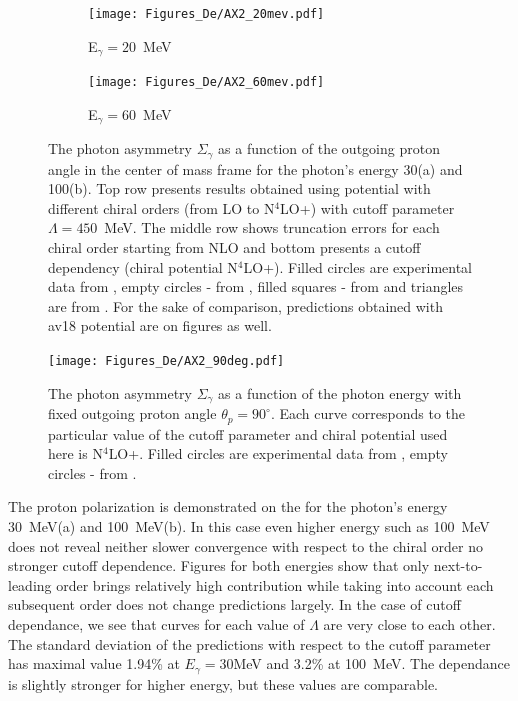     \begin{figure}[h]
        \centering
        \begin{subfigure}[b]{0.46\textwidth}
            \texttt{[image: Figures\_De/AX2\_20mev.pdf]}
            \caption{\small E$_\gamma = 20$~MeV}
            \label{AX_20_vert}
        \end{subfigure}
        \begin{subfigure}[b]{0.46\textwidth}
            \texttt{[image: Figures\_De/AX2\_60mev.pdf]}
            \caption{\small E$_\gamma = 60$~MeV}
            \label{AX_60_vert}
        \end{subfigure}
        \caption{The photon asymmetry $\Sigma_\gamma$ 
        as a function of the outgoing proton angle in the center of mass frame 
        for the photon's energy \SI{30}{\mev}(a) and \SI{100}{\mev}(b).
        Top row presents results obtained using potential
        with different chiral orders (from LO to N$^4$LO+) with cutoff parameter $\Lambda=450$~MeV.
        The middle row shows truncation errors for each 
        chiral order starting from NLO and
        bottom presents a cutoff dependency (chiral potential N$^4$LO+).
        Filled circles are experimental data from \cite{KRAUSE1992_asymetry},
        empty circles - from \cite{depascale_asymmetry}, filled squares
        - from \cite{Barannik_asymetry} and triangles are from \cite{Vnukov_asymmetry}.
        For the sake of comparison, predictions obtained with \gls*{av18} potential are on  figures as well.}
        \label{assymetry}
    \end{figure}
     
    \begin{figure}[h]
        \begin{center}
        \texttt{[image: Figures\_De/AX2\_90deg.pdf]}
        \end{center}
        \caption{The photon asymmetry $\Sigma_\gamma$ 
        as a function of the photon energy  
        with fixed outgoing proton angle $\theta_p=90^\circ$.
        Each curve corresponds to the particular value of the cutoff parameter
        and chiral potential used here is N$^4$LO+.
        Filled circles are experimental data from \cite{delbianco_1981},
        empty circles - from \cite{depascale_asymmetry}.}
        \label{asymmetry_90deg}
    \end{figure}
    

    The proton polarization is demonstrated on the  for the 
    photon's energy 30~MeV(a) and 100~MeV(b). In this case even higher energy
    such as 100~MeV does not reveal neither
    slower convergence with respect to the chiral order no
    stronger cutoff dependence. Figures for both energies show
    that only next-to-leading order brings relatively high contribution
    while taking into account each subsequent order does not change predictions
    largely. In the case of cutoff dependance, we see that curves for each
    value of $\Lambda$ are very close to each other. 
    The standard deviation of the predictions with respect to the cutoff parameter
    has maximal value 1.94\% at $E_\gamma = 30$MeV and 3.2\% at 100~MeV.
    The dependance is slightly stronger for higher energy, but these values are comparable.


